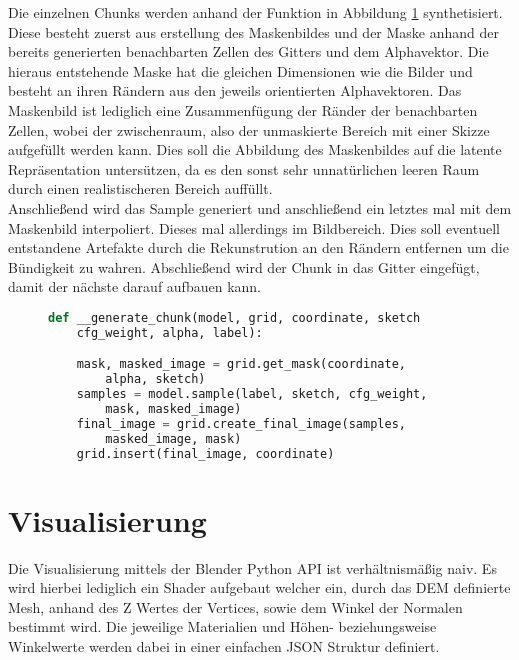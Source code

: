 Die einzelnen Chunks werden anhand der Funktion in Abbildung \ref{fig:gen_chunk} synthetisiert. Diese besteht zuerst aus erstellung des Maskenbildes und der Maske anhand der bereits generierten benachbarten Zellen des Gitters und dem Alphavektor. Die hieraus entstehende Maske hat die gleichen Dimensionen wie die Bilder und besteht an ihren Rändern aus den jeweils orientierten Alphavektoren. Das Maskenbild ist lediglich eine Zusammenfügung der Ränder der benachbarten Zellen, wobei der zwischenraum, also der unmaskierte Bereich mit einer Skizze aufgefüllt werden kann. Dies soll die Abbildung des Maskenbildes auf die latente Repräsentation untersützen, da es den sonst sehr unnatürlichen leeren Raum durch einen realistischeren Bereich auffüllt. \\
Anschließend wird das Sample generiert und anschließend ein letztes mal mit dem Maskenbild interpoliert. Dieses mal allerdings im Bildbereich. Dies soll eventuell entstandene Artefakte durch die Rekunstrution an den Rändern entfernen um die Bündigkeit zu wahren. Abschließend wird der Chunk in das Gitter eingefügt, damit der nächste darauf aufbauen kann.
\begin{figure}[htbp]
\begin{lstlisting}[language=python]
def __generate_chunk(model, grid, coordinate, sketch
    cfg_weight, alpha, label):

    mask, masked_image = grid.get_mask(coordinate, 
        alpha, sketch)
    samples = model.sample(label, sketch, cfg_weight,
        mask, masked_image)
    final_image = grid.create_final_image(samples, 
        masked_image, mask)
    grid.insert(final_image, coordinate)
\end{lstlisting}
    \captionsetup{type=figure}
    \label{fig:gen_chunk}
\end{figure}



\section {Visualisierung}

Die Visualisierung mittels der Blender Python API ist verhältnismäßig naiv. Es wird hierbei lediglich ein Shader aufgebaut welcher ein, durch das DEM definierte Mesh, anhand des Z Wertes der Vertices, sowie dem Winkel der Normalen bestimmt wird. Die jeweilige Materialien und Höhen- beziehungsweise Winkelwerte werden dabei in einer einfachen JSON Struktur definiert. 